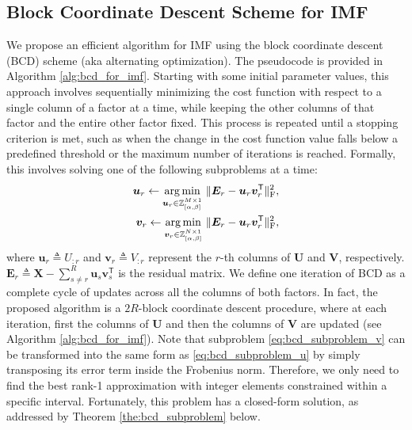 \subsection{Block Coordinate Descent Scheme for IMF} \label{sec:bcd}

We propose an efficient algorithm for IMF using the block coordinate descent (BCD) scheme (aka alternating optimization).
The pseudocode is provided in Algorithm \ref{alg:bcd_for_imf}.
Starting with some initial parameter values, this approach involves sequentially minimizing the cost function with respect to a single column of a factor at a time, while keeping the other columns of that factor and the entire other factor fixed. This process is repeated until a stopping criterion is met, such as when the change in the cost function value falls below a predefined threshold or the maximum number of iterations is reached. Formally, this involves solving one of the following subproblems at a time:
\begin{align}
    \bm{u}_r \gets \underset{\bm{u}_r \in \mathbb{Z}_{[\alpha,\beta]}^{M \times 1}}{\operatorname*{arg\,min}} \ \lVert \bm{E}_r - \bm{u}_r \bm{v}_r^\mathsf{T} \rVert_\text{F}^2, \label{eq:bcd_subproblem_u} \\
    \bm{v}_r \gets \underset{\bm{v}_r \in \mathbb{Z}_{[\alpha,\beta]}^{N \times 1}}{\operatorname*{arg\,min}} \ \lVert \bm{E}_r - \bm{u}_r \bm{v}_r^\mathsf{T} \rVert_\text{F}^2, \label{eq:bcd_subproblem_v}
\end{align}
where $\bm{u}_r \triangleq U_{:r}$ and $\bm{v}_r \triangleq V_{:r}$ represent the $r$-th columns of $\bm{U}$ and $\bm{V}$, respectively. $\bm{E}_r \triangleq \bm{X} - \sum_{s \neq r}^{R} \bm{u}_s \bm{v}_s^\mathsf{T}$ is the residual matrix. We define one iteration of BCD as a complete cycle of updates across all the columns of both factors. In fact, the proposed algorithm is a $2R$-block coordinate descent procedure, where at each iteration, first the columns of $\bm{U}$ and then the columns of $\bm{V}$ are updated (see Algorithm \ref{alg:bcd_for_imf}). Note that subproblem \eqref{eq:bcd_subproblem_v} can be transformed into the same form as \eqref{eq:bcd_subproblem_u} by simply transposing its error term inside the Frobenius norm. Therefore, we only need to find the best rank-1 approximation with integer elements constrained within a specific interval. Fortunately, this problem has a closed-form solution, as addressed by Theorem \ref{the:bcd_subproblem} below.

